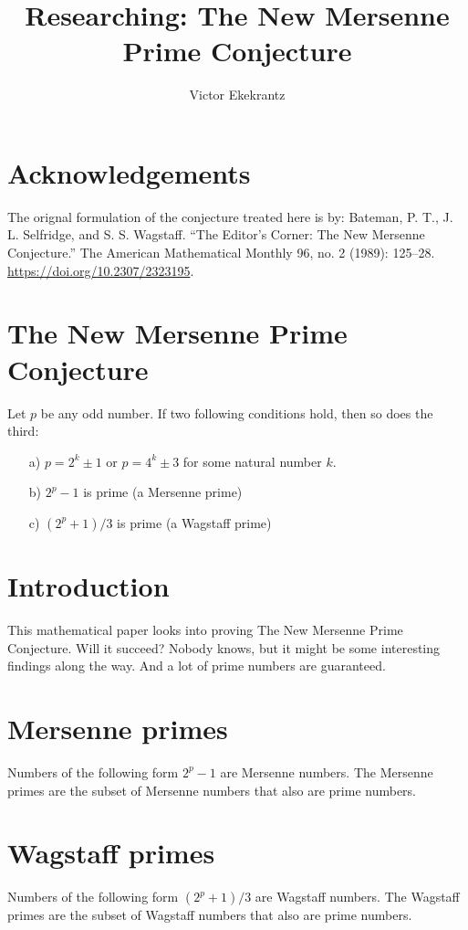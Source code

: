 \documentclass[12pt,a4paper]{article}
\author{Victor Ekekrantz}
\title{Researching: The New Mersenne Prime Conjecture}
\begin{document}
\maketitle
\newpage
\tableofcontents
\newpage

\section{Acknowledgements}
The orignal formulation of the conjecture treated here is  by:
Bateman, P. T., J. L. Selfridge, and S. S. Wagstaff. “The Editor’s Corner: The New Mersenne Conjecture.” The American Mathematical Monthly 96, no. 2 (1989): 125–28. \url{https://doi.org/10.2307/2323195}.

\section*{The New Mersenne Prime Conjecture}
Let $p$ be any odd number. If two following conditions hold, then so does the third:
\begin{itemize}
	\item[a)] $p=2^k\pm 1$ or $p=4^k\pm 3$ for some natural number $k$.
	\item[b)] $2^p - 1$ is prime (a Mersenne prime)
	\item[c)] $(2^p+1)/3$ is prime (a Wagstaff prime)
\end{itemize}

\section{Introduction}
This mathematical paper looks into proving The New Mersenne Prime Conjecture. Will it succeed? Nobody knows, but it might be some interesting findings along the way. And a lot of prime numbers are guaranteed.

\section{Mersenne primes}
Numbers of the following form $2^p - 1$ are Mersenne numbers. The Mersenne primes are the subset of Mersenne numbers that also are prime numbers.

\section{Wagstaff primes}
Numbers of the following form $(2^p+1)/3$ are Wagstaff numbers. The Wagstaff primes are the subset of Wagstaff numbers that also are prime numbers.


{}
\end{document}
